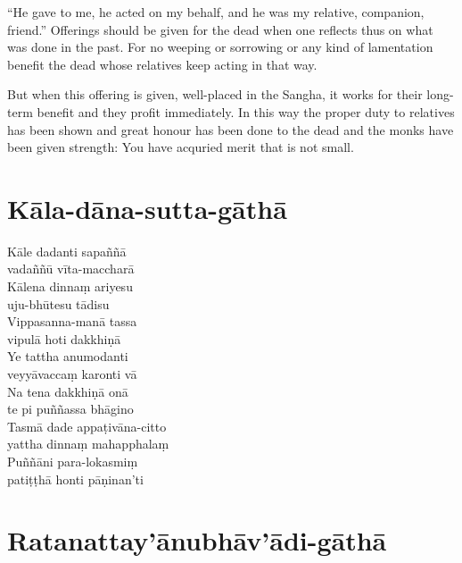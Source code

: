 
\begin{english}
  \setlength{\parskip}{8pt}%
  ``He gave to me, he acted on my behalf, and he was my relative, companion,
  friend.'' Offerings should be given for the dead when one reflects thus on
  what was done in the past. For no weeping or sorrowing or any kind of
  lamentation benefit the dead whose relatives keep acting in that way.

  But when this offering is given, well-placed in the Sangha, it works for their
  long-term benefit and they profit immediately. In this way the proper duty to
  relatives has been shown and great honour has been done to the dead and the
  monks have been given strength: You have acquried merit that is not small.\\ 
\end{english}

\section{Kāla-dāna-sutta-gāthā}


\begin{paritta}
  Kāle dadanti sapaññā\\\vin vadaññū vīta-maccharā\\
  Kālena dinnaṃ ariyesu\\\vin uju-bhūtesu tādisu\\
  Vippasanna-manā tassa\\\vin vipulā hoti dakkhiṇā\\
  Ye tattha anumodanti\\\vin veyyāvaccaṃ karonti vā\\
  Na tena dakkhiṇā onā\\\vin te pi puññassa bhāgino\\
  Tasmā dade appaṭivāna-citto\\\vin yattha dinnaṃ mahapphalaṃ\\
  Puññāni para-lokasmiṃ\\\vin patiṭṭhā honti pāṇinan'ti\\ 
\end{paritta}

\section{Ratanattay'ānubhāv'ādi-gāthā}

